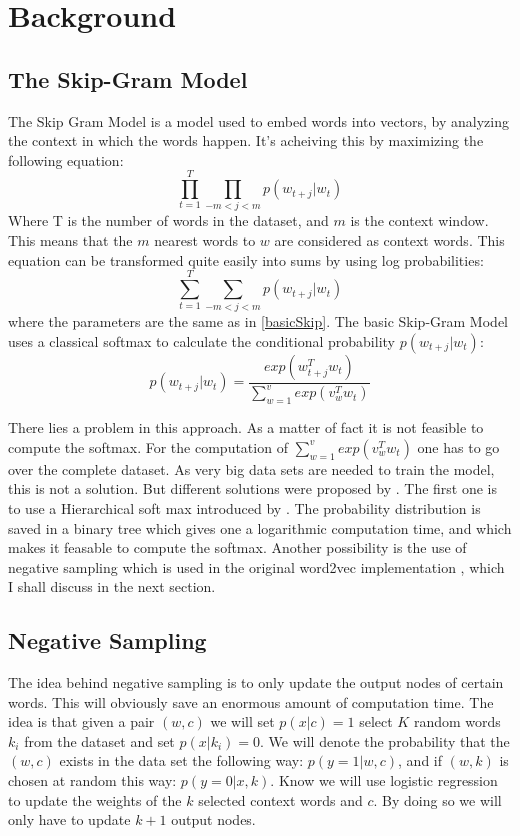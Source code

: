 \chapter{Background}\label{chap:background}

\section{The Skip-Gram Model} 
The Skip Gram Model is a model used to embed words into vectors, by analyzing the context in which the words happen. It's acheiving this by maximizing the following equation:\begin{equation} \label{basicSkip} \prod_{t=1}^T \prod_{-m<j<m}  p(w_{t+j}|w_t) \end{equation} Where T is the number of words in the dataset, and $m$ is the context window. This means that the $m$ nearest words to $w$ are considered as context words.
This equation can be transformed quite easily into sums by using log probabilities: 
\begin{equation} \sum _{t=1}^T \sum_{-m<j<m}  p(w_{t+j}|w_t) \end{equation} 
    where the parameters are the same as in \ref{basicSkip}. The basic Skip-Gram Model uses a classical softmax to calculate the conditional probability $p(w_{t+j}|w_t)$: 
   \begin{equation}
   p(w_{t+j}|w_t)=  \frac{exp(w_{t+j}^T w_t)}{\sum_{w=1}^v exp(v_w^T w_t)}
   \end{equation}
  
  There lies a problem in this approach. As a matter of fact it is not feasible to compute the softmax. For the computation of $\sum_{w=1}^v exp(v_w^T w_t)$ one  has to go over the complete dataset. As very big data sets are needed to train the model, this is not a solution. But different solutions were proposed by \cite{mikolov2}. The first one is to use a Hierarchical soft max introduced by \cite{hsoftmax}. The probability distribution is saved in a binary tree which gives one a logarithmic computation time, and which makes it feasable to compute the softmax. Another possibility is the use of negative sampling which is used in the original word2vec implementation \cite{mikolov2}, which I shall discuss in the next section. 

\section{Negative Sampling}
The idea behind negative sampling is to only update the output nodes of certain words. This will obviously save an enormous amount of computation time. The idea is that given a pair $(w,c)$ we will set $p(x|c) =1$ select $K$ random words $k_i$ from the dataset and set $p(x|k_i) = 0$. We will denote the probability that the $(w,c)$ exists in the data set the following way: $p(y=1|w,c)$, and if $(w,k) $ is chosen at random this way: $p(y=0|x,k)$.  Know we will use logistic regression to update the weights of the $k$ selected context words and $c$. By doing so we will only have to update $k+1$ output nodes.

